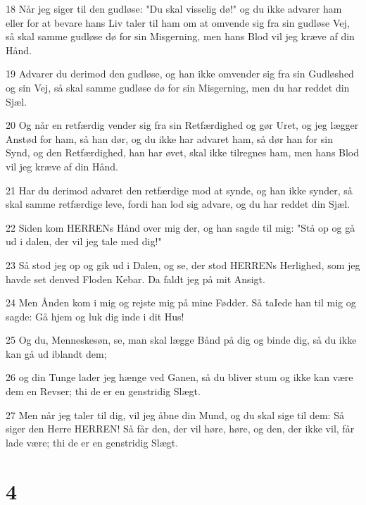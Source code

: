 \par 18 Når jeg siger til den gudløse: "Du skal visselig dø!" og du ikke advarer ham eller for at bevare hans Liv taler til ham om at omvende sig fra sin gudløse Vej, så skal samme gudløse dø for sin Misgerning, men hans Blod vil jeg kræve af din Hånd.
\par 19 Advarer du derimod den gudløse, og han ikke omvender sig fra sin Gudløshed og sin Vej, så skal samme gudløse dø for sin Misgerning, men du har reddet din Sjæl.
\par 20 Og når en retfærdig vender sig fra sin Retfærdighed og gør Uret, og jeg lægger Anstød for ham, så han dør, og du ikke har advaret ham, så dør han for sin Synd, og den Retfærdighed, han har øvet, skal ikke tilregnes ham, men hans Blod vil jeg kræve af din Hånd.
\par 21 Har du derimod advaret den retfærdige mod at synde, og han ikke synder, så skal samme retfærdige leve, fordi han lod sig advare, og du har reddet din Sjæl.
\par 22 Siden kom HERRENs Hånd over mig der, og han sagde til mig: "Stå op og gå ud i dalen, der vil jeg tale med dig!"
\par 23 Så stod jeg op og gik ud i Dalen, og se, der stod HERRENs Herlighed, som jeg havde set denved Floden Kebar. Da faldt jeg på mit Ansigt.
\par 24 Men Ånden kom i mig og rejste mig på mine Fødder. Så taIede han til mig og sagde: Gå hjem og luk dig inde i dit Hus!
\par 25 Og du, Menneskesøn, se, man skal lægge Bånd på dig og binde dig, så du ikke kan gå ud iblandt dem;
\par 26 og din Tunge lader jeg hænge ved Ganen, så du bliver stum og ikke kan være dem en Revser; thi de er en genstridig Slægt.
\par 27 Men når jeg taler til dig, vil jeg åbne din Mund, og du skal sige til dem: Så siger den Herre HERREN! Så får den, der vil høre, høre, og den, der ikke vil, får lade være; thi de er en genstridig Slægt.

\chapter{4}

